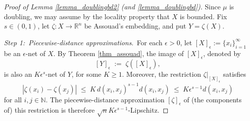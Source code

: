 \documentclass[reqno]{amsart}
\theoremstyle{plain}
\theoremstyle{definition}
\theoremstyle{remark}
\numberwithin{equation}{section}
\newcommand{\e}{\epsilon}
\newcommand{\N}{\mathbb{N}}
\newcommand{\R}{\mathbb{R}}
\begin{document}
\begin{proof}[Proof of Lemma \ref{lemma_doublingbd2} (and \ref{lemma_doublingbd})]
Since $\mu$ is doubling, we may assume by the locality property that $X$ is bounded.  Fix $s \in (0,1)$, let $\zeta : X \to \R^n$ be Assouad's embedding, and put $Y = \zeta(X)$.

\vspace{.025in}
{\em Step 1:\ Piecewise-distance approximations}.\  For each $\e > 0$, let $[X]_\e := \{x_i\}_{i=1}^\infty$ be an  $\e$-net of $X$.  By Theorem \ref{thm_assouad}, the image of $[X]_\e$, denoted by
$$
[Y]_\e \;:=\; \zeta([X]_\e),
$$
is also an $K\e^s$-net of $Y$, for some $K \geq 1$.  Moreover, the restriction $\zeta|_{[X]_\e}$ satisfies
$$
|\zeta(x_i) - \zeta(x_j)| \;\leq\;
K \, d(x_i,x_j)^{s-1}d(x_i,x_j) \;\leq\;
K\e^{s-1} d(x_i,x_j)
$$
for all $i,j \in \N$.  The piecewise-distance approximation $[\zeta]_\e$ of (the components of) this restriction is therefore $\sqrt{n}K\e^{s-1}$-Lipschitz.


\end{proof}
\end{document}
